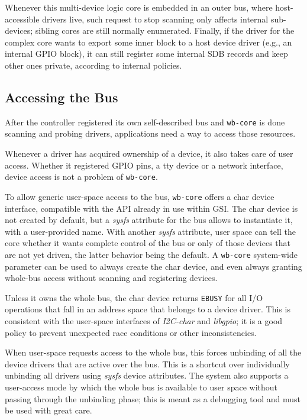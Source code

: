 \documentclass[a4paper, 12pt]{article}
\begin{document}
Whenever this multi-device logic core is embedded in an outer bus, where
host-accessible drivers live, such request to stop scanning only affects
internal sub-devices; sibling cores are still normally enumerated.  Finally,
if the driver for the complex core wants to export some inner block
to a host device driver (e.g., an internal GPIO block), it can still
register some internal SDB records and keep other ones private,
according to internal policies.


\subsection{Accessing the Bus}

After the controller registered its own self-described bus and
\texttt{wb-core} is done scanning and probing drivers, applications
need a way to access those resources.

Whenever a driver has acquired ownership of a device, it also takes
care of user access. Whether it registered GPIO pins, a tty device
or a network interface, device access is not a problem of \texttt{wb-core}.

To allow generic user-space access to the bus, \texttt{wb-core} offers
a char device interface, compatible with the API already in use within
GSI.  The char device is not created by default, but a \textit{sysfs}
attribute for the bus allows to instantiate it, with a user-provided
name.  With another \textit{sysfs} attribute, user space can tell the
core whether it wants complete control of the bus or only of those
devices that are not yet driven, the latter behavior being the
default.  A \texttt{wb-core} system-wide parameter can be used to always
create the char device, and even always granting whole-bus access
without scanning and registering devices.

Unless it owns the whole bus, the char device returns \texttt{EBUSY} for
all I/O operations that fall in an address space that belongs to a
device driver. This is consistent with the user-space interfaces of
\textit{I2C-char} and \textit{libgpio}; it is a good policy to prevent
unexpected race conditions or other inconsistencies.

When user-space requests access to the whole bus, this forces
unbinding of all the device drivers that are active over the bus.
This is a shortcut over individually unbinding all drivers using
\textit{sysfs} device attributes. The system also supports
a user-access mode by which the whole bus is available to
user space without passing through the unbinding phase; this is
meant as a debugging tool and must be used with great care.
\end{document}
